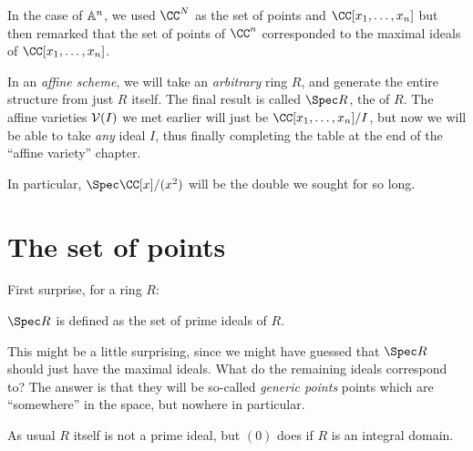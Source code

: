 \documentclass[11pt]{scrreprt}
\begin{document}
In the case of $\mathbb A^n$, we used $\CC^N$ as the set of points
and $\CC[x_1, \dots, x_n]$ but then remarked that the set of points
of $\CC^n$ corresponded to the maximal ideals of $\CC[x_1, \dots, x_n]$.

In an \emph{affine scheme}, we will take an \emph{arbitrary} ring $R$,
and generate the entire structure from just $R$ itself.
The final result is called $\Spec R$, the  of $R$.
The affine varieties $\mathcal V(I)$ we met earlier will just be
$\CC[x_1, \dots, x_n] / I$, but now we will be able to take
\emph{any} ideal $I$, thus finally completing the table at the end
of the ``affine variety'' chapter.

In particular, $\Spec \CC[x] / (x^2)$ will be the double we sought for so long.

\section{The set of points}

First surprise, for a ring $R$:
\begin{moral}
	$\Spec R$ is defined as the set of prime ideals of $R$.
\end{moral}

This might be a little surprising, since we might have guessed
that $\Spec R$ should just have the maximal ideals.
What do the remaining ideals correspond to?
The answer is that they will be so-called \emph{generic points}
points which are ``somewhere'' in the space, but nowhere in particular.

\begin{remark}
	As usual $R$ itself is not a prime ideal, but $(0)$
	does if $R$ is an integral domain.
\end{remark}
\end{document}
